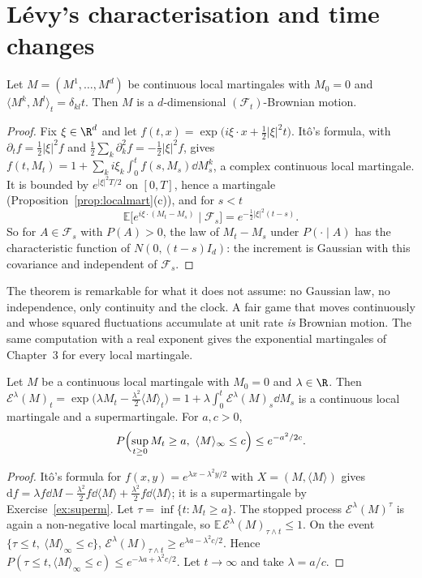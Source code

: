 \section{L\'evy's characterisation and time changes}

\begin{theorem}\label{thm:levychar}
Let $M=(M^1,\dots,M^d)$ be continuous local martingales with $M_0=0$ and $\langle M^k,M^l\rangle_t=\delta_{kl}t$. Then $M$ is a $d$-dimensional $(\mathcal F_t)$-Brownian motion.
\end{theorem}

\begin{proof}
Fix $\xi\in\R^d$ and let $f(t,x)=\exp\bigl(i\xi\cdot x+\frac12|\xi|^2t\bigr)$. It\^o's formula, with $\partial_tf=\frac12|\xi|^2f$ and $\frac12\sum_k\partial_k^2f=-\frac12|\xi|^2f$, gives
$f(t,M_t)=1+\sum_ki\xi_k\int_0^tf(s,M_s)\dd M^k_s$, a complex continuous local martingale. It is bounded by $e^{|\xi|^2T/2}$ on $[0,T]$, hence a martingale (Proposition~\ref{prop:localmart}(c)), and for $s<t$
\[
\mathbb E\bigl[e^{i\xi\cdot(M_t-M_s)}\mid \mathcal F_s\bigr]=e^{-\frac12|\xi|^2(t-s)} .
\]
So for $A\in\mathcal F_s$ with $P(A)>0$, the law of $M_t-M_s$ under $P(\cdot\mid A)$ has the characteristic function of $N(0,(t-s)I_d)$: the increment is Gaussian with this covariance and independent of $\mathcal F_s$.
\end{proof}

The theorem is remarkable for what it does not assume: no Gaussian law, no independence, only continuity and the clock. A fair game that moves continuously and whose squared fluctuations accumulate at
unit rate \emph{is} Brownian motion. The same computation with a real exponent gives the exponential martingales of Chapter~3 for every local martingale.

\begin{proposition}\label{prop:expmartgen}
Let $M$ be a continuous local martingale with $M_0=0$ and $\lambda\in\R$. Then $\mathcal E^\lambda(M)_t=\exp\bigl(\lambda M_t-\frac{\lambda^2}2\langle M\rangle_t\bigr)=1+\lambda\int_0^t\mathcal E^\lambda(M)_s\dd M_s$ is a continuous local martingale and
a supermartingale. For $a,c>0$,
\[
P\Bigl(\sup_{t\ge0}M_t\ge a,\ \langle M\rangle_\infty\le c\Bigr)\le e^{-a^2/2c}.
\]
\end{proposition}

\begin{proof}
It\^o's formula for $f(x,y)=e^{\lambda x-\lambda^2y/2}$ with $X=(M,\langle M\rangle)$ gives $\mathrm df=\lambda f\dd M-\frac{\lambda^2}2f\dd\langle M\rangle+\frac{\lambda^2}2f\dd\langle M\rangle$; it is a supermartingale by
Exercise~\ref{ex:superm}. Let $\tau=\inf\{t:M_t\ge a\}$. The stopped process $\mathcal E^\lambda(M)^\tau$ is again a non-negative local martingale, so $\mathbb E\,\mathcal E^\lambda(M)_{\tau\wedge t}\le1$. On the event
$\{\tau\le t,\ \langle M\rangle_\infty\le c\}$, $\mathcal E^\lambda(M)_{\tau\wedge t}\ge e^{\lambda a-\lambda^2c/2}$. Hence $P(\tau\le t,\langle M\rangle_\infty\le c)\le e^{-\lambda a+\lambda^2c/2}$. Let $t\to\infty$ and take $\lambda=a/c$.
\end{proof}

